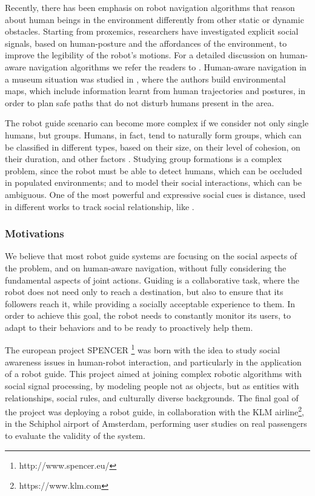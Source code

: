 Recently, there has been emphasis on robot navigation algorithms that reason about human beings in the environment differently from other static or dynamic obstacles. Starting from proxemics, researchers have investigated explicit social signals, based on human-posture and the affordances of the environment, to improve the legibility of the robot's motions. For a detailed discussion on human-aware navigation algorithms we refer the readers to \cite{kruse2013human,rios-ijsr-2014}. Human-aware navigation in a museum situation was studied in \cite{samejima2015building}, where the authors build environmental maps, which include information learnt from human trajectories and postures, in order to plan safe paths that do not disturb humans present in the area. 

The robot guide scenario can become more complex if we consider not only single humans, but groups. Humans, in fact, tend to naturally form groups, which can be classified in different types, based on their size, on their level of cohesion, on their duration, and other factors \cite{forsyth2009group}.  Studying group formations is a complex problem, since the robot must be able to detect humans, which can be occluded in populated environments; and to model their social interactions, which can be ambiguous. One of the most powerful and expressive social cues is distance, used in different works to track social relationship, like \cite{luber2013multi}. 

\subsubsection{Motivations}
We believe that most robot guide systems are focusing on the social aspects of the problem, and on human-aware navigation, without fully considering the fundamental aspects of joint actions. Guiding is a collaborative task, where the robot does not need only to reach a destination, but also to ensure that its followers reach it, while providing a socially acceptable experience to them. In order to achieve this goal, the robot needs to constantly monitor its users, to adapt to their behaviors and to be ready to proactively help them.

The european project SPENCER \footnote{http://www.spencer.eu/} was born with the idea to study social awareness issues in human-robot interaction, and particularly in the application of a robot guide. This project aimed at joining complex robotic algorithms  with social signal processing, by modeling people not as objects, but as entities with relationships, social rules, and culturally diverse backgrounds. The final goal of the project was deploying a robot guide, in collaboration with the KLM airline\footnote{https://www.klm.com}, in the Schiphol airport of Amsterdam, performing user studies on real passengers to evaluate the validity of the system.

